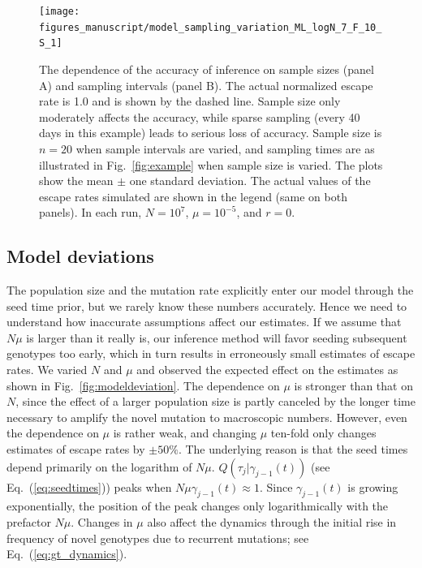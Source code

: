 \documentclass{frontiers}
\newcommand{\EQ}[1]{Eq.~(\ref{eq:#1})}
\newcommand{\FIG}[1]{Fig.~\ref{fig:#1}}
\newcommand{\gtfreq}{\gamma}
\begin{document}
\begin{figure}[htp]
\begin{center}
  \texttt{[image: figures\_manuscript/model\_sampling\_variation\_ML\_logN\_7\_F\_10\_S\_1]}
  \caption[labelInTOC]{The dependence of the accuracy of inference on sample sizes (panel A)
  and sampling intervals (panel B). The actual normalized 
  escape rate is 1.0 and is shown by the dashed line. Sample size only moderately 
  affects the
  accuracy, while sparse sampling (every 40 days in this example) leads to
  serious loss of accuracy. Sample size is
  $n=20$ when sample intervals are varied, and sampling times are as
  illustrated in \FIG{example} when sample size is varied. The plots show the
  mean $\pm$ one standard deviation. The actual values of the escape rates simulated
are shown in the legend (same on both panels). In each run,
$N = 10^7$, $\mu = 10^{-5}$, and $r=0$.}
  \label{fig:sample}
\end{center}
\end{figure}


\subsection{Model deviations}
The population size and the mutation rate explicitly enter our model through the
seed time prior, but we rarely know these numbers accurately. Hence we
need to understand how inaccurate assumptions affect our estimates.
If we assume that $N\mu$ is larger than it really is, our inference
method will favor seeding subsequent
genotypes too early, which in turn results in erroneously small estimates of escape rates. We varied
$N$ and $\mu$ and observed the expected effect on the estimates as shown in
\FIG{modeldeviation}. The dependence on $\mu$ is stronger than that on $N$, since
the effect of a larger population size is partly canceled by the longer time
necessary to amplify the novel mutation to macroscopic numbers.
However, even the dependence on $\mu$ is rather weak, and
changing $\mu$ ten-fold only changes estimates of escape rates by $\pm 50\%$.
The underlying reason is that the seed times depend primarily on the logarithm
of $N\mu$. $Q(\tau_j|\gtfreq_{j-1}(t))$ (see \EQ{seedtimes}) peaks when $N\mu
\gtfreq_{j-1}(t)\approx 1$. Since $\gtfreq_{j-1}(t)$ is growing
exponentially, the position of the peak changes only logarithmically
with the prefactor $N\mu$. Changes in $\mu$ also affect the dynamics
through the initial rise in frequency of novel genotypes due to recurrent
mutations; see \EQ{gt_dynamics}.
\end{document}
